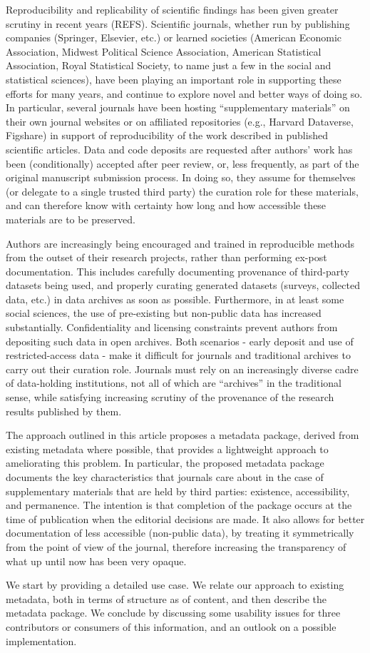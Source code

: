 Reproducibility and replicability of scientific findings has been given greater scrutiny in recent years (REFS). Scientific journals, whether run by publishing companies (Springer, Elsevier, etc.) or learned societies (American Economic Association, Midwest Political Science Association, American Statistical Association, Royal Statistical Society, to name just a few in the social and statistical sciences), have been playing an important role in supporting these efforts for many years, and continue to explore novel and better ways of doing so. In particular, several journals have been hosting ``supplementary materials'' on their own journal websites or on affiliated repositories (e.g., Harvard Dataverse, Figshare) in support of reproducibility of the work described in published scientific articles. Data and code deposits are requested after authors' work has been (conditionally) accepted after peer review, or, less frequently, as part of the original manuscript submission process. In doing so, they assume for themselves (or delegate to a single trusted third party) the curation role for these materials, and can therefore know with certainty how long and how accessible these materials are to be preserved.

Authors are increasingly being encouraged and trained in reproducible methods from the outset of their research projects, rather than performing ex-post documentation. This includes carefully documenting provenance of third-party datasets being used, and properly curating generated datasets (surveys, collected data, etc.) in data archives as soon as possible. Furthermore, in at least some social sciences, the use of pre-existing but non-public data has increased substantially.  Confidentiality and licensing constraints prevent authors from depositing such data in open archives. Both scenarios - early deposit and use of restricted-access data - make it difficult for journals and traditional archives to carry out their curation role. Journals must rely on an increasingly diverse cadre of data-holding institutions, not all of which are ``archives'' in the traditional sense, while satisfying increasing scrutiny of the provenance of the research results published by them. 

The approach outlined in this article proposes a metadata package, derived from existing metadata where possible, that provides a lightweight approach to ameliorating this problem. In particular, the proposed metadata package documents the key characteristics that journals care about in the case of supplementary materials that are held by third parties: existence, accessibility, and permanence. The intention is that completion of the package occurs at the time of publication when the editorial decisions are made. It also allows for better documentation of less accessible (non-public data), by treating it symmetrically from the point of view of the journal, therefore increasing the transparency of what up until now has been very opaque.

We start by providing a detailed use case. We relate our approach to existing metadata, both in terms of structure as of content, and then describe the metadata package. We conclude by discussing some usability issues for three contributors or consumers of this information, and an outlook on a possible implementation.